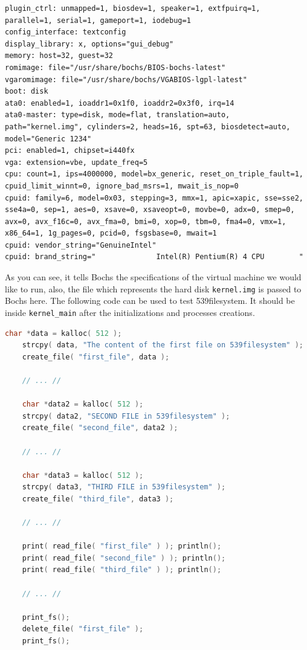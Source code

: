 \begin{lstlisting}
plugin_ctrl: unmapped=1, biosdev=1, speaker=1, extfpuirq=1, parallel=1, serial=1, gameport=1, iodebug=1
config_interface: textconfig
display_library: x, options="gui_debug"
memory: host=32, guest=32
romimage: file="/usr/share/bochs/BIOS-bochs-latest"
vgaromimage: file="/usr/share/bochs/VGABIOS-lgpl-latest"
boot: disk
ata0: enabled=1, ioaddr1=0x1f0, ioaddr2=0x3f0, irq=14
ata0-master: type=disk, mode=flat, translation=auto, path="kernel.img", cylinders=2, heads=16, spt=63, biosdetect=auto, model="Generic 1234"
pci: enabled=1, chipset=i440fx
vga: extension=vbe, update_freq=5
cpu: count=1, ips=4000000, model=bx_generic, reset_on_triple_fault=1, cpuid_limit_winnt=0, ignore_bad_msrs=1, mwait_is_nop=0
cpuid: family=6, model=0x03, stepping=3, mmx=1, apic=xapic, sse=sse2, sse4a=0, sep=1, aes=0, xsave=0, xsaveopt=0, movbe=0, adx=0, smep=0, avx=0, avx_f16c=0, avx_fma=0, bmi=0, xop=0, tbm=0, fma4=0, vmx=1, x86_64=1, 1g_pages=0, pcid=0, fsgsbase=0, mwait=1
cpuid: vendor_string="GenuineIntel"
cpuid: brand_string="              Intel(R) Pentium(R) 4 CPU        "
\end{lstlisting}

As you can see, it tells Bochs the specifications of the virtual machine
we would like to run, also, the file which represents the hard disk
\lstinline!kernel.img! is passed to Bochs here. The following code can
be used to test 539filesystem. It should be inside
\lstinline!kernel_main! after the initializations and processes
creations.

\begin{lstlisting}[language=C]
    char *data = kalloc( 512 );
    strcpy( data, "The content of the first file on 539filesystem" );   
    create_file( "first_file", data );
    
    // ... //
    
    char *data2 = kalloc( 512 );
    strcpy( data2, "SECOND FILE in 539filesystem" );
    create_file( "second_file", data2 );
    
    // ... //
    
    char *data3 = kalloc( 512 );
    strcpy( data3, "THIRD FILE in 539filesystem" );
    create_file( "third_file", data3 );
        
    // ... //
    
    print( read_file( "first_file" ) ); println();
    print( read_file( "second_file" ) ); println();
    print( read_file( "third_file" ) ); println();
    
    // ... //
    
    print_fs();
    delete_file( "first_file" );
    print_fs();
\end{lstlisting}

